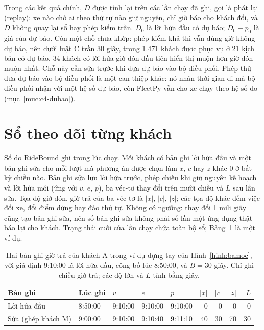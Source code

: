 Trong các kết quả chính, $D$ được tính lại trên các lần chạy đã ghi, gọi là phát lại (replay): xe nào chở ai
theo thứ tự nào giữ nguyên, chỉ giờ báo cho khách đổi, và $D$ không quay lại sổ hay phép kiểm trần. $D_0$ là lời
hứa đầu có dự báo; $D_0 - p_0$ là giá của dự báo. Còn một chỗ chưa khớp: phép kiểm khả thi vẫn dùng giờ không dự
báo, nên dưới luật C trần 30 giây, trong 1.471 khách được phục vụ ở 21 kịch bản có dự báo, 34 khách có lời hứa
giờ đón đầu tiên hiển thị muộn hơn giờ đón muộn nhất. Chỗ này cần sửa trước khi đưa dự báo vào bộ điều phối. Phép
thử đưa dự báo vào bộ điều phối là một can thiệp khác: nó nhân thời gian đi mà bộ điều phối nhận với một hệ số dự
báo, còn FleetPy vẫn cho xe chạy theo hệ số đo (mục~\ref{muc:c4-dubao}).

\section{Sổ theo dõi từng khách}
\label{muc:so}

Sổ do RideBound ghi trong lúc chạy. Mỗi khách có bản ghi lời hứa đầu và một bản ghi sửa cho mỗi lượt mà phương
án được chọn làm $x$, $c$ hay $z$ khác 0 ở bất kỳ chiều nào. Bản ghi sửa lưu lời hứa trước, phép chiếu khi giữ
nguyên kế hoạch và lời hứa mới (ứng với $v$, $e$, $p$), ba véc-tơ thay đổi trên mười chiều và $L$ sau lần sửa.
Tọa độ giờ đón, giờ trả của ba véc-tơ là $|x|$, $|c|$, $|z|$; các tọa độ khác đếm việc đổi xe, đổi điểm dừng hay
đảo thứ tự. Không có ngưỡng: thay đổi 1 mili giây cũng tạo bản ghi sửa, nên số bản ghi sửa không phải số lần một
ứng dụng thật báo lại cho khách. Trạng thái cuối của lần chạy chứa toàn bộ sổ; Bảng~\ref{bang:vidu-so} là một
ví dụ.

\begin{table}[htbp]
\centering
\caption{Hai bản ghi giờ trả của khách A trong ví dụ dựng tay của Hình~\ref{hinh:bamoc}, với giả định 9:10:00
là lời hứa đầu, công bố lúc 8:50:00, và $B = 30$ giây. Chỉ ghi chiều giờ trả; các độ lớn và $L$ tính bằng
giây.}
\label{bang:vidu-so}
\small
\begin{tabular}{@{}lllllrrrr@{}}
\toprule
\textbf{Bản ghi} & \textbf{Lúc ghi} & $v$ & $e$ & $p$ & $|x|$ & $|c|$ & $|z|$ & $L$\\
\midrule
Lời hứa đầu & 8:50:00 & 9:10:00 & 9:10:00 & 9:10:00 & 0 & 0 & 0 & 0\\
Sửa (ghép khách M) & 9:00:00 & 9:10:00 & 9:10:40 & 9:11:10 & 40 & 30 & 70 & 30\\
\bottomrule
\end{tabular}
\end{table}

